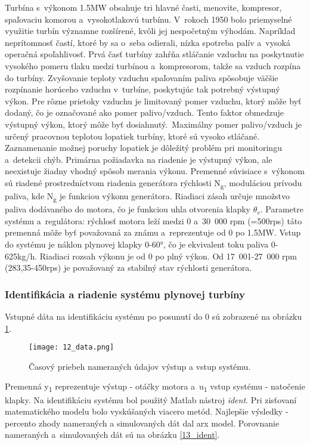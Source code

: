 \indent Turbína s~výkonom 1.5MW obsahuje tri hlavné časti, menovite, kompresor,
spaľovaciu komorou a~vysokotlakovú turbínu. V~rokoch 1950 bolo
priemyselné využitie turbín významne rozšírené, kvôli jej nespočetným
výhodám. Napríklad neprítomnosť častí, ktoré by sa o~seba odierali,
nízka spotreba palív a~vysoká operačná spoľahlivosť. Prvá časť turbíny
zahŕňa stláčanie vzduchu na poskytnutie vysokého pomeru tlaku medzi
turbínou a~kompresorom, takže sa vzduch rozpína do turbíny. Zvyšovanie
teploty vzduchu spaľovaním paliva spôsobuje väčšie rozpínanie horúceho
vzduchu v~turbíne, poskytujúc tak potrebný výstupný výkon. Pre rôzne
prietoky vzduchu je limitovaný pomer vzduchu, ktorý môže byť dodaný, čo
je označované ako pomer palivo/vzduch. Tento faktor obmedzuje výstupný
výkon, ktorý môže byť dosiahnutý.~Maximálny pomer palivo/vzduch je
určený pracovnou teplotou lopatiek turbíny, ktoré sú vysoko stláčané.
Zaznamenanie možnej poruchy lopatiek je dôležitý problém pri monitoringu
a~detekcii chýb. Primárna požiadavka na riadenie je výstupný výkon, ale
neexistuje žiadny vhodný spôsob merania výkonu. Premenné súvisiace
s~výkonom sú riadené prostredníctvom riadenia generátora rýchlosti
N\textsubscript{g}, moduláciou prívodu paliva, kde N\textsubscript{g} je
funkciou výkonu generátora. Riadiaci zásah určuje množstvo paliva
dodávaného do motora, čo je funkciou uhla otvorenia klapky
\(\theta_{v}.\) Parametre systému a~regulátora: rýchlosť
motora leží medzi 0 a~30~000 rpm (=500rps) táto premenná môže byť
považovaná za známu a~reprezentuje od 0 po 1.5MW. Vstup do systému je
náklon plynovej klapky 0-60°, čo je ekvivalent toku paliva 0-625kg/h.
Riadiaci rozsah výkonu je od 0 po plný výkon. Od 17~001-27~000 rpm
(283,35-450rps) je považovaný za stabilný stav rýchlosti generátora.\cite{MPC07}
\subsubsection{Identifikácia a riadenie systému plynovej turbíny}
Vstupné dáta na identifikáciu systému po posunutí do 0 sú zobrazené na obrázku  \ref{12_data}. 

\begin{figure}[!htbp]
\centering
\texttt{[image: 12\_data.png]}
\caption{Časový priebeh nameraných údajov výstup a vstup systému.}
\label{12_data}
\end{figure}
Premenná y\textsubscript{1} reprezentuje výstup - otáčky motora a~u\textsubscript{1}
vstup systému - natočenie klapky. Na identifikáciu systému bol použitý Matlab nástroj \textit{ident}. Pri zisťovaní matematického modelu bolo vyskúšaných viacero metód. Najlepšie
výsledky - percento zhody nameraných a simulovaných dát dal arx model. Porovnanie nameraných a~simulovaných dát sú na
obrázku \ref{13_ident}.


